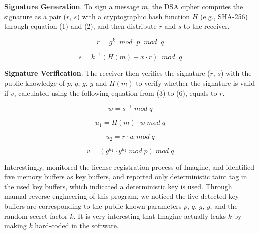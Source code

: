 \begin{compactitem}
\item \textbf{Signature Generation}. To sign a message $m$, the \textsf{\small DSA} cipher computes the signature as a pair ($r$, $s$) with a cryptographic hash function $H$ (e.g., SHA-256) through equation (1) and (2), and then distribute $r$ and $s$ to the receiver.

\begin{equation}
r = g^k \;\; mod \;\; p \;\; mod \;\; q  
\end{equation}

\begin{equation}
s = k^{-1} (H(m) + x \cdot r) \;\; mod \;\; q
\end{equation}

\item \textbf{Signature Verification}.
The receiver then verifies the signature ($r$, $s$) with the public knowledge of $p$, $q$, $g$, $y$ and $H(m)$ to verify whether the signature is valid if $v$, calculated using the following equation from (3) to (6), equals to $r$.

\begin{equation}
w = s^{-1} \; mod \; q
\end{equation}

\begin{equation}
u_1 = H(m) \cdot w \; mod \; q
\end{equation}

\begin{equation}
u_2 = r \cdot w \; mod \; q
\end{equation}

\begin{equation}
v = (g^{u_1} \cdot y^{u_2} \; mod \; p ) \; mod \; q
\end{equation}

\end{compactitem}


Interestingly, \sysname monitored the license registration process of \textsf{\small Imagine}, and identified five memory buffers as key buffers, and reported only deterministic taint tag in the used key buffers, which indicated a deterministic key is used.
Through manual reverse-engineering of this program, we noticed the five detected key buffers are corresponding to the public known parameters $p$, $q$, $g$, $y$, and the random secret factor $k$. 
It is very interesting that \textsf{\small Imagine} actually leaks $k$ by making $k$ hard-coded in the software.


